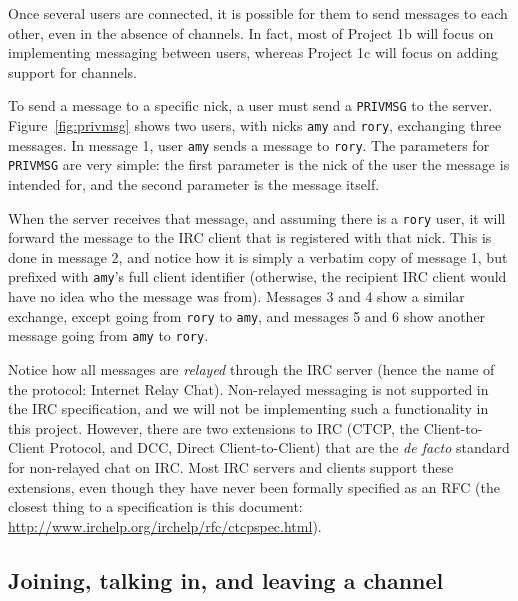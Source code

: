\documentclass[10pt]{article}
\begin{document}
Once several users are connected, it is possible for them to send messages to each other, even in the absence of channels. In fact, most of Project 1b will focus on implementing messaging between users, whereas Project 1c will focus on adding support for channels.

To send a message to a specific nick, a user must send a \texttt{PRIVMSG} to the server. Figure~\ref{fig:privmsg} shows two users, with nicks \texttt{amy} and \texttt{rory}, exchanging three messages. In message 1, user \texttt{amy} sends a message to \texttt{rory}. The parameters for \texttt{PRIVMSG} are very simple: the first parameter is the nick of the user the message is intended for, and the second parameter is the message itself.

When the server receives that message, and assuming there is a \texttt{rory} user, it will forward the message to the IRC client that is registered with that nick. This is done in message 2, and notice how it is simply a verbatim copy of message 1, but prefixed with \texttt{amy}'s full client identifier (otherwise, the recipient IRC client would have no idea who the message was from). Messages 3 and 4 show a similar exchange, except going from \texttt{rory} to \texttt{amy}, and messages 5 and 6 show another message going from \texttt{amy} to \texttt{rory}.

Notice how all messages are \emph{relayed} through the IRC server (hence the name of the protocol: Internet Relay Chat). Non-relayed messaging is not supported in the IRC specification, and we will not be implementing such a functionality in this project. However, there are two extensions to IRC (CTCP, the Client-to-Client Protocol, and DCC, Direct Client-to-Client) that are the \emph{de facto} standard for non-relayed chat on IRC. Most IRC servers and clients support these extensions, even though they have never been formally specified as an RFC (the closest thing to a specification is this document: \url{http://www.irchelp.org/irchelp/rfc/ctcpspec.html}).


\subsection{Joining, talking in, and leaving a channel}
\end{document}
